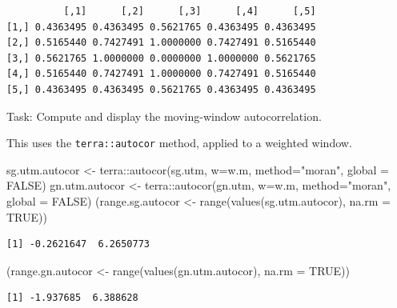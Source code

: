\documentclass[
  letterpaper,
  DIV=11,
  numbers=noendperiod]{scrartcl}
\newenvironment{Shaded}{\begin{snugshade}}{\end{snugshade}}
\newcommand{\AttributeTok}[1]{\textcolor[rgb]{0.40,0.45,0.13}{#1}}
\newcommand{\ConstantTok}[1]{\textcolor[rgb]{0.56,0.35,0.01}{#1}}
\newcommand{\FunctionTok}[1]{\textcolor[rgb]{0.28,0.35,0.67}{#1}}
\newcommand{\NormalTok}[1]{\textcolor[rgb]{0.00,0.23,0.31}{#1}}
\newcommand{\OtherTok}[1]{\textcolor[rgb]{0.00,0.23,0.31}{#1}}
\newcommand{\SpecialCharTok}[1]{\textcolor[rgb]{0.37,0.37,0.37}{#1}}
\newcommand{\StringTok}[1]{\textcolor[rgb]{0.13,0.47,0.30}{#1}}
\begin{document}
\begin{verbatim}
          [,1]      [,2]      [,3]      [,4]      [,5]
[1,] 0.4363495 0.4363495 0.5621765 0.4363495 0.4363495
[2,] 0.5165440 0.7427491 1.0000000 0.7427491 0.5165440
[3,] 0.5621765 1.0000000 0.0000000 1.0000000 0.5621765
[4,] 0.5165440 0.7427491 1.0000000 0.7427491 0.5165440
[5,] 0.4363495 0.4363495 0.5621765 0.4363495 0.4363495
\end{verbatim}

Task: Compute and display the moving-window autocorrelation.

This uses the \texttt{terra::autocor} method, applied to a weighted
window.

\begin{Shaded}
\begin{Highlighting}[]
\NormalTok{sg.utm.autocor }\OtherTok{\textless{}{-}}\NormalTok{ terra}\SpecialCharTok{::}\FunctionTok{autocor}\NormalTok{(sg.utm, }\AttributeTok{w=}\NormalTok{w.m, }
                                 \AttributeTok{method=}\StringTok{"moran"}\NormalTok{, }\AttributeTok{global =} \ConstantTok{FALSE}\NormalTok{)}
\NormalTok{gn.utm.autocor }\OtherTok{\textless{}{-}}\NormalTok{ terra}\SpecialCharTok{::}\FunctionTok{autocor}\NormalTok{(gn.utm, }\AttributeTok{w=}\NormalTok{w.m, }
                                 \AttributeTok{method=}\StringTok{"moran"}\NormalTok{, }\AttributeTok{global =} \ConstantTok{FALSE}\NormalTok{)}
\NormalTok{(range.sg.autocor }\OtherTok{\textless{}{-}} \FunctionTok{range}\NormalTok{(}\FunctionTok{values}\NormalTok{(sg.utm.autocor), }\AttributeTok{na.rm =} \ConstantTok{TRUE}\NormalTok{))}
\end{Highlighting}
\end{Shaded}

\begin{verbatim}
[1] -0.2621647  6.2650773
\end{verbatim}

\begin{Shaded}
\begin{Highlighting}[]
\NormalTok{(range.gn.autocor }\OtherTok{\textless{}{-}} \FunctionTok{range}\NormalTok{(}\FunctionTok{values}\NormalTok{(gn.utm.autocor), }\AttributeTok{na.rm =} \ConstantTok{TRUE}\NormalTok{))}
\end{Highlighting}
\end{Shaded}

\begin{verbatim}
[1] -1.937685  6.388628
\end{verbatim}
\end{document}
